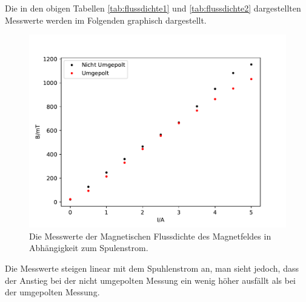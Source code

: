       Die in den obigen Tabellen \ref{tab:flussdichte1} und \ref{tab:flussdichte2} dargestellten Messwerte werden
      im Folgenden graphisch dargestellt.
      \begin{figure}
        \centering
          \includegraphics[width=\textwidth]{auswertung/magnetplot1.pdf}
          \caption{Die Messwerte der Magnetischen Flussdichte des Magnetfeldes in Abhängigkeit zum Spulenstrom.}
          \label{fig:magnet1}
      \end{figure}
      Die Messwerte steigen linear mit dem Spuhlenstrom an, man sieht jedoch, dass der Anstieg bei der nicht umgepolten
      Messung ein wenig höher ausfällt als bei der umgepolten Messung. 
  \label{sec:Auswertung}
